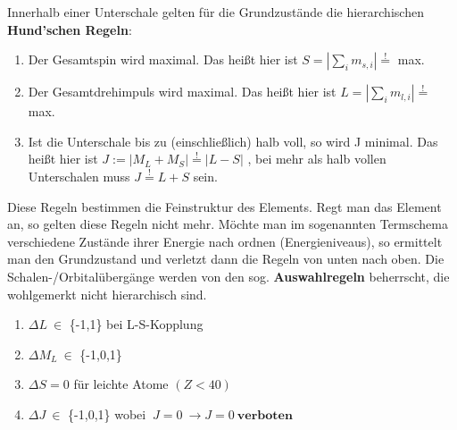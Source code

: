 \documentclass[Ex4_Zusammenfassung.tex]{subfiles}
\begin{document}
Innerhalb einer Unterschale gelten für die Grundzustände die hierarchischen \newline \textbf{Hund'schen Regeln}: 
\begin{enumerate}
\item Der Gesamtspin wird maximal. Das heißt hier ist $S = |\sum_i m_{s,i}| \stackrel{!}{=}$ max. 
\item Der Gesamtdrehimpuls  wird maximal. Das heißt hier ist  $L = |\sum_i m_{l,i}| \stackrel{!}{=}$ max.
\item Ist die Unterschale bis zu (einschließlich) halb voll, so wird J minimal. Das heißt hier ist  $ J := \lvert M_L + M_S \rvert \stackrel{!}{=} \lvert L-S \rvert $ , bei mehr als halb vollen Unterschalen muss $ J \stackrel{!}{=} L+S $ sein. 
\end{enumerate} 

Diese Regeln bestimmen die Feinstruktur des Elements. Regt man das Element an, so gelten diese Regeln nicht mehr. Möchte man im sogenannten Termschema verschiedene Zustände ihrer Energie nach ordnen (Energieniveaus), so ermittelt man den Grundzustand und verletzt dann die Regeln von unten nach oben.
Die  Schalen-/Orbitalübergänge werden von den sog. \textbf{Auswahlregeln} beherrscht, die wohlgemerkt nicht hierarchisch sind. 
\begin{enumerate}
\item $ \Delta L \  \in $ \{-1,1\}  bei L-S-Kopplung
\item $ \Delta M_L \   \in  $ \{-1,0,1\}  
\item $ \Delta S =0 $ für leichte Atome $(Z <40)$
\item $\Delta J \  \in $  \{-1,0,1\}   wobei $ \ J =0 \  \rightarrow J=0 \  \textbf{verboten} $
\end{enumerate}
\end{document}
